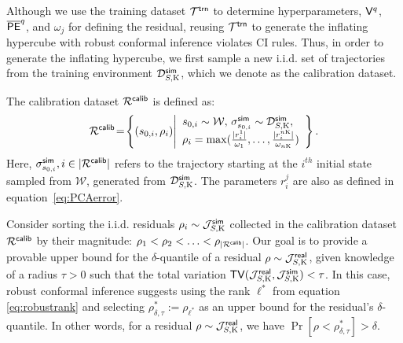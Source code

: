Although we use the training dataset $\mathcal{T}^{\mathsf{trn}}$ to determine hyperparameters, $\mathsf{V}^{ q}$, $\overline{\mathsf{PE}}^q$, and $\omega_j$ for defining the residual, reusing $\mathcal{T}^{\mathsf{trn}}$ to generate the inflating hypercube with robust conformal inference violates CI rules. Thus, in order to generate the inflating hypercube, we first sample a new i.i.d. set of trajectories from the training environment $\mathcal{D}_{S,\mathrm{K}}^{\mathsf{sim}}$, which we denote as the calibration dataset.
\begin{definition} The calibration dataset $\mathcal{R}^{\mathsf{calib}}$ is defined as:
\begin{equation}
\mathcal{R}^{\mathsf{calib}} \!=\! 
\left\{ 
    \left(s_{0,i}, \rho_i \right) \middle|
    \begin{array}{l}
        s_{0,i}\sim \mathcal{W}, \, \sigma^{\mathsf{sim}}_{s_{0,i}} \sim \mathcal{D}_{S,\mathrm{K}}^{\mathsf{sim}},  \\
        \rho_i = \max( \frac{|r^1_i|}{\omega_1}, \ldots, \frac{|r^{n\mathrm{K}}_i|}{\omega_{n\mathrm{K}}})
    \end{array}
\right\}.
\end{equation}
\noindent Here, $\sigma^{\mathsf{sim}}_{s_{0,i}}, i \in |\mathcal{R}^{\mathsf{calib}}|$ refers to the trajectory starting at the $i^{th}$ initial state sampled from $\mathcal{W}$, generated from $\mathcal{D}_{S,\mathrm{K}}^{\mathsf{sim}}$. The parameters $r^j_i$ are also as defined in equation~\eqref{eq:PCAerror}.
\end{definition}

Consider sorting the i.i.d. residuals $\rho_i \sim \mathcal{J}_{S,\mathrm{K}}^{\mathsf{sim}}$ collected in the calibration dataset $\mathcal{R}^{\mathsf{calib}}$ by their magnitude: $\rho_1 < \rho_2 < \ldots < \rho_{|\mathcal{R}^{\mathsf{calib}}|}$. Our goal is to provide a provable upper bound for the $\delta$-quantile of a residual $\rho \sim \mathcal{J}_{S,\mathrm{K}}^{\mathsf{real}}$, given knowledge of a radius $\tau > 0$ such that the total variation $\mathsf{TV}(\mathcal{J}_{S,\mathrm{K}}^{\mathsf{real}}, \mathcal{J}_{S,\mathrm{K}}^{\mathsf{sim}}) < \tau$. In this case, robust conformal inference \cite{cauchois2020robust} suggests using the rank $\ell^*$ from equation \eqref{eq:robustrank} and selecting $\rho^*_{\delta, \tau} := \rho_{\ell^*}$ as an upper bound for the residual's $\delta$-quantile. In other words, for a residual $\rho \sim \mathcal{J}_{S,\mathrm{K}}^{\mathsf{real}}$, we have $\Pr[\rho < \rho^*_{\delta, \tau}] > \delta$.

